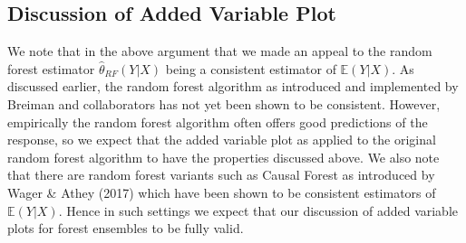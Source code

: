 \documentclass[12pt,twoside]{reedthesis}
\theoremstyle{definition}
\theoremstyle{definition}
\theoremstyle{definition}
\theoremstyle{remark}
\begin{document}
\subsection{Discussion of Added Variable
Plot}\label{discussion-of-added-variable-plot}

We note that in the above argument that we made an appeal to the random
forest estimator \(\hat{\theta}_{RF}(Y|X)\) being a consistent estimator
of \(\mathbb{E}(Y|X)\). As discussed earlier, the random forest
algorithm as introduced and implemented by Breiman and collaborators has
not yet been shown to be consistent. However, empirically the random
forest algorithm often offers good predictions of the response, so we
expect that the added variable plot as applied to the original random
forest algorithm to have the properties discussed above. We also note
that there are random forest variants such as Causal Forest as
introduced by Wager \& Athey (2017) which have been shown to be
consistent estimators of \(\mathbb{E}(Y|X)\). Hence in such settings we
expect that our discussion of added variable plots for forest ensembles
to be fully valid. \par
\end{document}
